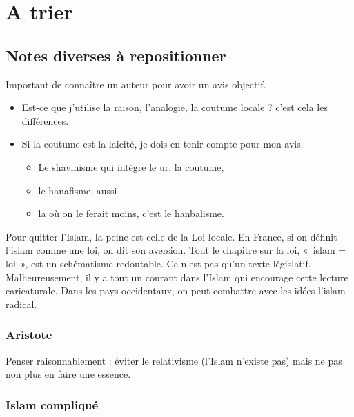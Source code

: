 
\chapter{A trier}


\section{Notes diverses à repositionner}







Important de connaître un auteur pour avoir un avis objectif.





\begin{itemize}

  
\item  Est-ce que j'utilise la raison, l'analogie, la coutume locale ? c'est
  cela les différences.
\item  Si la coutume est la laicité, je dois en tenir compte pour mon avis.

  \begin{itemize}
  \item    Le shavinisme qui intègre le ur, la coutume,
  \item     le hanafisme, aussi~
  \item    la où on le ferait moins, c'est le hanbalisme.
  \end{itemize}
\end{itemize}



  Pour quitter l'Islam, la peine est celle de la Loi locale. En France,
  si on définit l'islam comme une loi, on dit son aversion. Tout le
  chapitre sur la loi, «~islam = loi~», est un schématisme redoutable.
  Ce n'est pas qu'un texte législatif. Malheureusement, il y a tout un
  courant dans l'Islam qui encourage cette lecture caricaturale. Dans
  les pays occidentaux, on peut combattre avec les idées l'islam
  radical.
  
  \subsection{Aristote}
  Penser raisonnablement : éviter le relativisme (l'Islam n'existe pas) mais ne pas non plus en faire une essence.
  
  \subsection{Islam compliqué}


